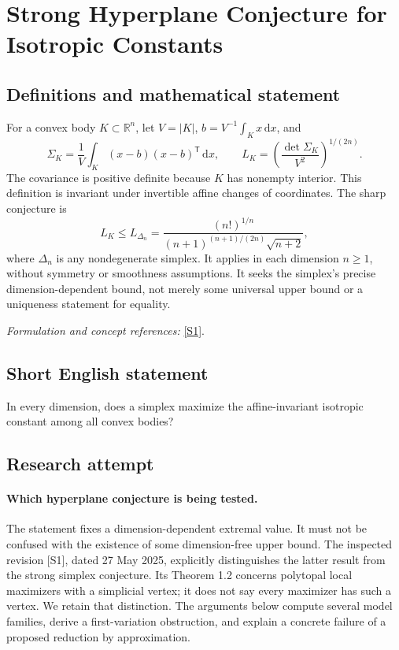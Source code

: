 \documentclass[11pt]{article}
\begin{document}
\section*{\texorpdfstring{Strong Hyperplane Conjecture for Isotropic Constants}{Strong Hyperplane Conjecture for Isotropic Constants}}\label{30006882}
\subsection{Definitions and mathematical statement}
For a convex body $K\subset{\mathbb{R}}^n$, let $V=|K|$, $b=V^{-1}\int_Kx{\,\mathrm{d}} x$, and
\[
 \Sigma_K=\frac1V\int_K(x-b)(x-b)^{\mathsf T}{\,\mathrm{d}} x,
 \qquad L_K=\left(\frac{\det\Sigma_K}{V^2}\right)^{1/(2n)}.
\]
The covariance is positive definite because $K$ has nonempty interior. This definition is invariant under invertible affine changes of coordinates. The sharp conjecture is
\[
 L_K\le L_{\Delta_n}
 =\frac{(n!)^{1/n}}{(n+1)^{(n+1)/(2n)}\sqrt{n+2}},
\]
where $\Delta_n$ is any nondegenerate simplex. It applies in each dimension $n\ge1$, without symmetry or smoothness assumptions. It seeks the simplex's precise dimension-dependent bound, not merely some universal upper bound or a uniqueness statement for equality.
\par\smallskip\textit{Formulation and concept references:} \href{https://arxiv.org/pdf/2407.01353v2}{[S1]}.

\subsection{Short English statement}
In every dimension, does a simplex maximize the affine-invariant isotropic constant among all convex bodies?
\subsection{Research attempt}
\paragraph{Which hyperplane conjecture is being tested.}
The statement fixes a dimension-dependent extremal value. It must
not be confused with the existence of some dimension-free upper
bound. The inspected revision [S1], dated 27 May 2025, explicitly
distinguishes the latter result from the strong simplex conjecture.
Its Theorem 1.2 concerns polytopal local maximizers with a simplicial
vertex; it does not say every maximizer has such a vertex. We retain
that distinction. The arguments below compute several model families,
derive a first-variation obstruction, and explain a concrete failure
of a proposed reduction by approximation.
\end{document}
